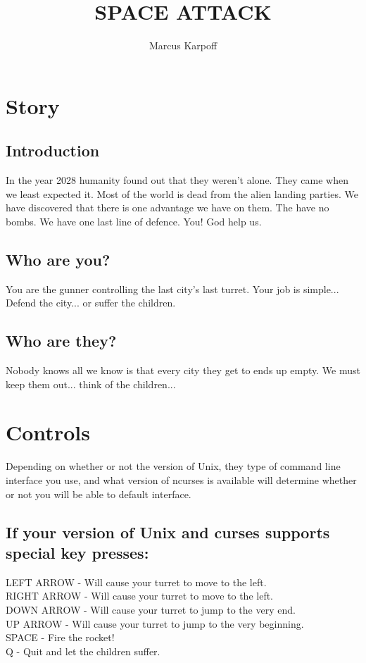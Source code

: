 \documentclass{article}
\title{SPACE ATTACK}
\author{Marcus Karpoff}
\date{}
\begin{document}
\maketitle

\pagebreak

\tableofcontents

\pagebreak

\section{Story}

\subsection{Introduction}
In the year 2028 humanity found out that they weren't alone. They came when we 
least expected it. Most of the world is dead from the alien landing parties. We
have discovered that there is one advantage we have on them. The have no bombs.
We have one last line of defence. You! God help us.

\subsection{Who are you?}
You are the gunner controlling the last city's last turret. Your job is simple... Defend the city... or suffer the children.

\subsection{Who are they?}
Nobody knows all we know is that every city they get to ends up empty. We must 
keep them out... think of the children...

\section{Controls}
Depending on whether or not the version of Unix, they type of command line 
interface you use, and what version of ncurses is available will determine 
whether or not you will be able to default interface.

\subsection*{If your version of Unix and curses supports special key presses:}
LEFT ARROW - Will cause your turret to move to the left.\\
RIGHT ARROW - Will cause your turret to move to the left.\\
DOWN ARROW - Will cause your turret to jump to the very end.\\
UP ARROW - Will cause your turret to jump to the very beginning.\\
SPACE - Fire the rocket!\\
Q - Quit and let the children suffer.
\end{document}
